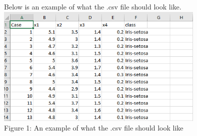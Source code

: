 \documentclass[12pt]{article}
\begin{document}
		Below is an example of what the .csv file should look like.\\
		
			\includegraphics[width=10cm]{csv.png}\\
			Figure 1: An example of what the .csv file should look like
			
\end{document}
